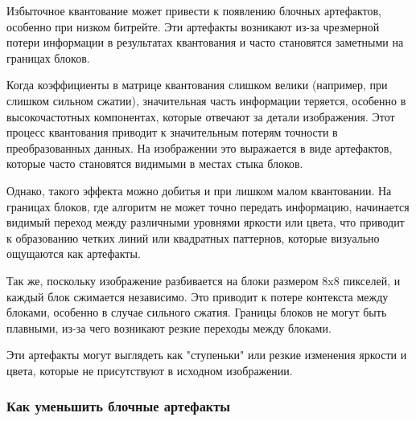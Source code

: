\YQuantize

\CbCrQuantize

Избыточное квантование может привести к появлению блочных артефактов, особенно при низком битрейте. 
Эти артефакты возникают из-за чрезмерной потери информации в результатах квантования и часто становятся заметными на границах блоков.

Когда коэффициенты в матрице квантования слишком велики (например, при слишком сильном сжатии), 
значительная часть информации теряется, особенно в высокочастотных компонентах, которые отвечают за детали изображения. 
Этот процесс квантования приводит к значительным потерям точности в преобразованных данных. 
На изображении это выражается в виде артефактов, которые часто становятся видимыми в местах стыка блоков.

Однако, такого эффекта можно добитья и при лишком малом квантовании.
На границах блоков, где алгоритм не может точно передать информацию, 
начинается видимый переход между различными уровнями яркости или цвета, 
что приводит к образованию четких линий или квадратных паттернов, которые визуально ощущаются как артефакты.

Так же, поскольку изображение разбивается на блоки размером 8x8 пикселей, и каждый блок сжимается независимо. 
Это приводит к потере контекста между блоками, особенно в случае сильного сжатия. 
Границы блоков не могут быть плавными, из-за чего возникают резкие переходы между блоками.

Эти артефакты могут выглядеть как "ступеньки" или резкие изменения яркости и цвета, которые не присутствуют в исходном изображении.

\subsubsection{Как уменьшить блочные артефакты}

